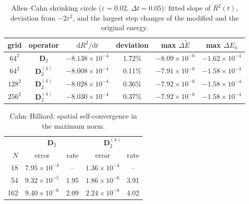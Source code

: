 \documentclass[11pt]{article}
\begin{document}
\begin{table}[htbp]\centering\small
\caption{Allen--Cahn shrinking circle ($\varepsilon=0.02$, $\Delta t=0.05$): fitted slope of $R^2(t)$, deviation from $-2\varepsilon^2$, and the largest step changes of the modified and the original energy.}
\begin{tabular}{cc cccc}
\toprule
grid & operator & $\mathrm dR^2/\mathrm dt$ & deviation & max $\Delta\tilde E$ & max $\Delta E_h$\\
\midrule
$64^2$ & $\mathbf D_2$ & $-8.138{\times}10^{-4}$ & 1.72\% & $-8.09{\times}10^{-6}$ & $-1.62{\times}10^{-4}$\\
$64^2$ & $\mathbf D_2^{(4)}$ & $-8.008{\times}10^{-4}$ & 0.11\% & $-7.91{\times}10^{-6}$ & $-1.58{\times}10^{-4}$\\
$128^2$ & $\mathbf D_2^{(4)}$ & $-8.028{\times}10^{-4}$ & 0.36\% & $-7.92{\times}10^{-6}$ & $-1.58{\times}10^{-4}$\\
$256^2$ & $\mathbf D_2^{(4)}$ & $-8.030{\times}10^{-4}$ & 0.37\% & $-7.92{\times}10^{-6}$ & $-1.58{\times}10^{-4}$\\
\bottomrule
\end{tabular}
\end{table}

\clearpage
\begin{table}[htbp]\centering\small
\caption{Cahn--Hilliard: spatial self-convergence in the maximum norm.}
\begin{tabular}{r cc cc}
\toprule
& \multicolumn{2}{c}{$\mathbf D_2$} & \multicolumn{2}{c}{$\mathbf D_2^{(4)}$}\\
$N$ & error & rate & error & rate\\
\midrule
18 & $7.95{\times}10^{-4}$ & -- & $1.36{\times}10^{-4}$ & --\\
54 & $9.32{\times}10^{-5}$ & 1.95 & $1.86{\times}10^{-6}$ & 3.91\\
162 & $9.40{\times}10^{-6}$ & 2.09 & $2.24{\times}10^{-8}$ & 4.02\\
\bottomrule
\end{tabular}
\end{table}
\end{document}
